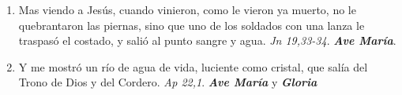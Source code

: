 \documentclass[../../devocionario.tex]{subfiles}
\begin{document}
\begin{enumerate}
        \item Mas viendo a Jesús, cuando vinieron, como le vieron ya muerto, no le quebrantaron las piernas, 
            sino que uno de los soldados con una lanza le traspasó el costado, y salió al punto sangre y agua. \textit{Jn 19,33-34}. \textbf{\textit{Ave María}}.

        \item Y me mostró un río de agua de vida, luciente como cristal, que salía del Trono de Dios y del Cordero. \textit{Ap 22,1}. \textbf{\textit{Ave María}} y \textbf{\textit{Gloria}}

    \end{enumerate}
\end{document}
